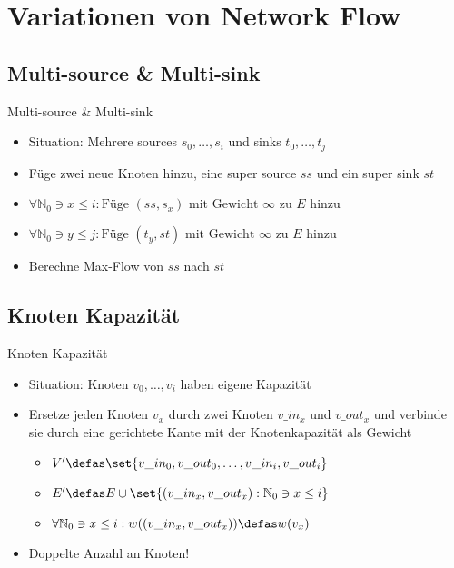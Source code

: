 \section{Variationen von Network Flow}
\subsection{Multi-source \& Multi-sink}
\begin{frame}{Multi-source \& Multi-sink}
    \begin{itemize}
        \pause\item Situation: Mehrere sources $s_0,\dots,s_i$ und sinks $t_0,\dots,t_j$
        \pause\item Füge zwei neue Knoten hinzu, eine super source $ss$ und ein super sink $st$
        \pause\item \(\forall \mathbb{N}_0 \ni x \leq i : \text{Füge } (ss, s_x) \text{ mit
        Gewicht $\infty$ zu $E$ hinzu}\)
        \item \(\forall \mathbb{N}_0 \ni y \leq j : \text{Füge } (t_y, st) \text{ mit
        Gewicht $\infty$ zu $E$ hinzu}\)
        \pause\item Berechne Max-Flow von $ss$ nach $st$
    \end{itemize}
\end{frame}

\subsection{Knoten Kapazität}
\begin{frame}{Knoten Kapazität}
    \begin{itemize}
        \pause\item Situation: Knoten $v_0,\dots,v_i$ haben eigene Kapazität
        \pause\item Ersetze jeden Knoten $v_x$ durch zwei Knoten $v\_in_x$ und $v\_out_x$ und verbinde sie durch eine gerichtete Kante mit der Knotenkapazität als Gewicht
		\begin{itemize}
        \pause\item \(V' \defas \set{v\_in_0, v\_out_0, \dots, v\_in_i, v\_out_i}\)
        \pause\item \(E' \defas E \cup \set{(v\_in_x, v\_out_x) : \mathbb{N}_0 \ni x \leq i}\)
        \pause\item \(\forall \mathbb{N}_0 \ni x \leq i : w((v\_in_x, v\_out_x)) \defas w(v_x)\)
        \end{itemize}
        \pause\item Doppelte Anzahl an Knoten!
    \end{itemize}
\end{frame}

